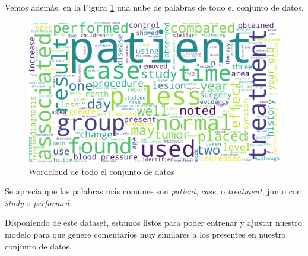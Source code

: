 Vemos además, en la Figura \ref{fig:wordcloud} una nube de palabras de todo el conjunto de datos.

\begin{figure}[h]
	\centering
	\includegraphics[width=.9\textwidth]{media/wordcloud_full_data.png}
	\caption{Wordcloud de todo el conjunto de datos}
	\label{fig:wordcloud}
\end{figure}

Se aprecia que las palabras más comunes son \textit{patient}, \textit{case}, o \textit{treatment}, junto con \textit{study} o \textit{performed}.

Disponiendo de este dataset, estamos listos para poder entrenar y ajustar nuestro modelo para que genere comentarios muy similares a los presentes en nuestro conjunto de datos.